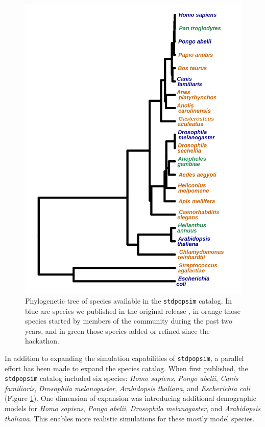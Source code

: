 \documentclass[hidelinks]{article}
\newcommand{\stdpopsim}{\texttt{stdpopsim}\xspace}
\begin{document}
\begin{figure}
	\includegraphics[width=\linewidth]{./figs/species_fig.png}
	\caption{Phylogenetic tree of species available in the \stdpopsim catalog.
		In blue are species we published in the original release \citep{Adrion2020}, in orange those 
		species started by members of the community during the past two years, and in green those species
		added or refined since the hackathon.
		\color{red}{Names are cutoff on right hand side of figure}}
	\label{fig:tree}
\end{figure}


In addition to expanding the simulation capabilities of \stdpopsim,
a parallel effort has been made to expand the species catalog.
When first published, the \stdpopsim catalog included six species:
\emph{Homo sapiens}, \emph{Pongo abelii}, \emph{Canis familiaris}, \emph{Drosophila melanogaster},
\emph{Arabidopsis thaliana}, and \emph{Escherichia coli} (Figure \ref{fig:tree}).
One dimension of expansion was introducing additional demographic models
for \emph{Homo sapiens}, \emph{Pongo abelii}, \emph{Drosophila melanogaster},
and \emph{Arabidopsis thaliana}. This enables more realistic simulations for these
mostly model species.
\end{document}
